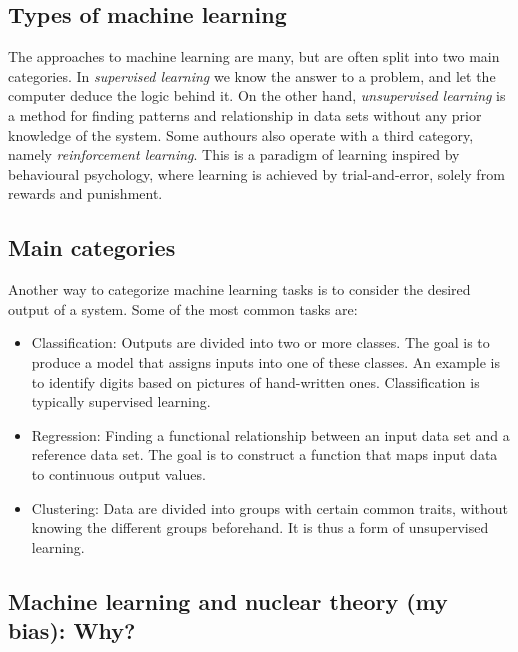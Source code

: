 \documentclass[%
oneside,                 %
final,                   %
10pt]{article}
\begin{document}
\subsection{Types of machine learning}

\begin{block}{}
The approaches to machine learning are many, but are often split into two main categories. 
In \emph{supervised learning} we know the answer to a problem,
and let the computer deduce the logic behind it. On the other hand, \emph{unsupervised learning}
is a method for finding patterns and relationship in data sets without any prior knowledge of the system.
Some authours also operate with a third category, namely \emph{reinforcement learning}. This is a paradigm 
of learning inspired by behavioural psychology, where learning is achieved by trial-and-error, 
solely from rewards and punishment.
\end{block}

\subsection{Main categories}
\begin{block}{}
Another way to categorize machine learning tasks is to consider the desired output of a system.
Some of the most common tasks are:

\begin{itemize}
  \item Classification: Outputs are divided into two or more classes. The goal is to   produce a model that assigns inputs into one of these classes. An example is to identify  digits based on pictures of hand-written ones. Classification is typically supervised learning.

  \item Regression: Finding a functional relationship between an input data set and a reference data set.   The goal is to construct a function that maps input data to continuous output values.

  \item Clustering: Data are divided into groups with certain common traits, without knowing the different groups beforehand.  It is thus a form of unsupervised learning.
\end{itemize}

\noindent
\end{block}

\subsection{Machine learning and nuclear theory (my bias): Why?}
\end{document}
